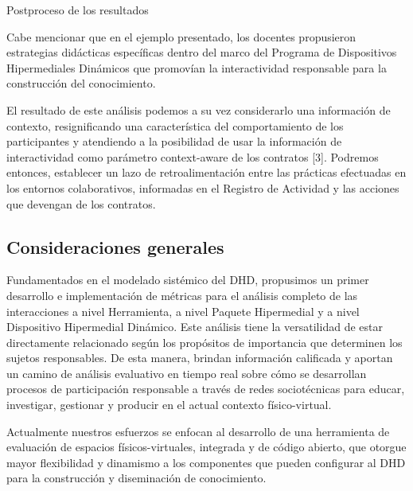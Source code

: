 \caption {Postproceso de los resultados}

Cabe mencionar que en el ejemplo presentado, los docentes propusieron estrategias didácticas específicas dentro del marco del Programa de Dispositivos Hipermediales Dinámicos que promovían la interactividad responsable para la construcción del conocimiento.

El resultado de este análisis podemos a su vez considerarlo una información de contexto, resignificando una característica del comportamiento de los participantes y atendiendo a la posibilidad de usar la información de interactividad como parámetro context-aware de los contratos [3]. Podremos entonces, establecer un lazo de retroalimentación entre las prácticas efectuadas en los entornos colaborativos, informadas en el Registro de Actividad y las acciones que devengan de los contratos.



\subsection {Consideraciones generales}
  
Fundamentados en el modelado sistémico del DHD, propusimos un primer desarrollo e implementación de métricas para el análisis completo de las interacciones a nivel Herramienta, a nivel Paquete Hipermedial y a nivel Dispositivo Hipermedial Dinámico. Este análisis tiene la versatilidad de estar directamente relacionado según los propósitos de importancia que determinen los sujetos responsables. De esta manera, brindan información calificada y aportan un camino de análisis evaluativo en tiempo real sobre cómo se desarrollan procesos de participación responsable a través de redes sociotécnicas para educar, investigar, gestionar y producir en el actual contexto físico-virtual.


Actualmente nuestros esfuerzos se enfocan al desarrollo de una herramienta de evaluación de espacios físicos-virtuales, integrada y de código abierto, que otorgue mayor flexibilidad y dinamismo a los componentes que pueden configurar al DHD para la construcción y diseminación de conocimiento.
